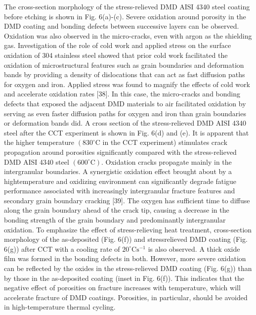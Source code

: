 \documentclass[10pt]{article}
\begin{document}
The cross-section morphology of the stress-relieved DMD AISI 4340 steel coating before etching is shown in Fig. 6(a)-(c). Severe oxidation around porosity in the DMD coating and bonding defects between successive layers can be observed. Oxidation was also observed in the micro-cracks, even with argon as the shielding gas. Investigation of the role of cold work and applied stress on the surface oxidation of 304 stainless steel showed that prior cold work facilitated the oxidation of microstructural features such as grain boundaries and deformation bands by providing a density of dislocations that can act as fast diffusion paths for oxygen and iron. Applied stress was found to magnify the effects of cold work and accelerate oxidation rates [38]. In this case, the micro-cracks and bonding defects that exposed the adjacent DMD materials to air facilitated oxidation by serving as even faster diffusion paths for oxygen and iron than grain boundaries or deformation bands did. A cross section of the stress-relieved DMD AISI 4340 steel after the CCT experiment is shown in Fig. 6(d) and (e). It is apparent that the higher temperature $\left(830^{\circ} \mathrm{C}\right.$ in the $\mathrm{CCT}$ experiment) stimulates crack propagation around porosities significantly compared with the stress-relieved DMD AISI 4340 steel $\left(600^{\circ} \mathrm{C}\right)$. Oxidation cracks propagate mainly in the intergranular boundaries. A synergistic oxidation effect brought about by a hightemperature and oxidizing environment can significantly degrade fatigue performance associated with increasingly intergranular fracture features and secondary grain boundary cracking [39]. The oxygen has sufficient time to diffuse along the grain boundary ahead of the crack tip, causing a decrease in the bonding strength of the grain boundary and predominantly intergranular oxidation. To emphasize the effect of stress-relieving heat treatment, cross-section morphology of the as-deposited (Fig. 6(f)) and stressrelieved DMD coating (Fig. 6(g)) after CCT with a cooling rate of $20^{\circ} \mathrm{C} \mathrm{s}^{-1}$ is also observed. A thick oxide film was formed in the bonding defects in both. However, more severe oxidation can be reflected by the oxides in the stress-relieved DMD coating (Fig. 6(g)) than by those in the as-deposited coating (inset in Fig. 6(f)). This indicates that the negative effect of porosities on fracture increases with temperature, which will accelerate fracture of DMD coatings. Porosities, in particular, should be avoided in high-temperature thermal cycling.
\end{document}
